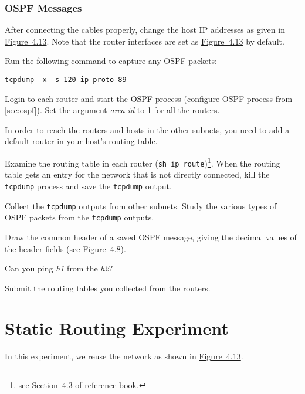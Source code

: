 \documentclass{../UTNetLab}
\begin{document}
\section{OSPF Messages}
    After connecting the cables properly, change the host IP addresses as given in \hyperref[fig:4.13]{Figure~4.13}.
    Note that the router interfaces are set as \hyperref[fig:4.13]{Figure~4.13} by default.

    Run the following command to capture any OSPF packets: 
    \begin{lstlisting}[morekeywords={[3]ip,proto}]
tcpdump -x -s 120 ip proto 89
    \end{lstlisting}

    Login to each router and start the OSPF process (configure OSPF process from \autoref{sec:ospf}).
    Set the argument \textit{area-id} to 1 for all the routers.

    In order to reach the routers and hosts in the other subnets, you need to add a default router in your host’s routing table.

    Examine the routing table in each router (\lstinline[language={cisco}]{sh ip route})\footnote{see Section~4.3 of reference book.}.
    When the routing table gets an entry for the network that is not directly connected, kill the \lstinline{tcpdump} process and save the \lstinline{tcpdump} output.

    Collect the \lstinline{tcpdump} outputs from other subnets.
    Study the various types of OSPF packets from the \lstinline{tcpdump} outputs.
    
    \begin{report}
        \item Draw the common header of a saved OSPF message, giving the decimal values of the header fields (see \hyperref[fig:4.8]{Figure~4.8}).
        
        \item Can you ping \textit{h1} from the \textit{h2}?
        
        \item Submit the routing tables you collected from the routers.
    \end{report}

\part{Static Routing Experiment}\label{sec:static}
    In this experiment, we reuse the network as shown in \hyperref[fig:4.13]{Figure~4.13}.
\end{document}
